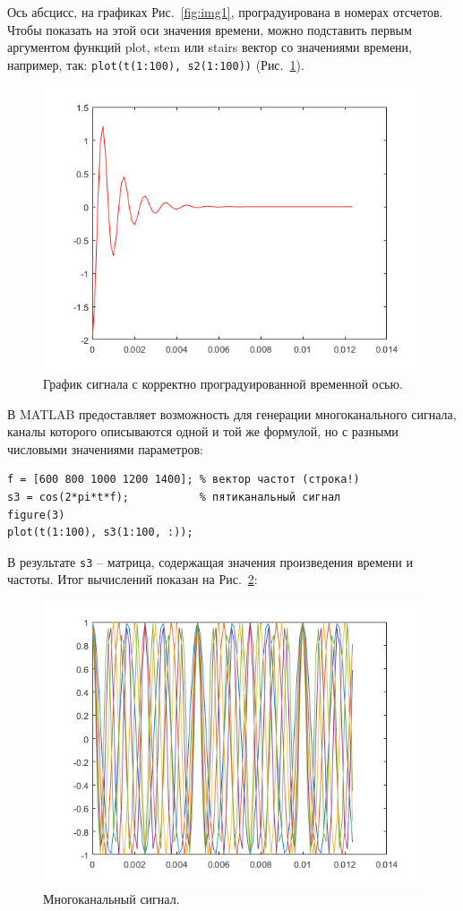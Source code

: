 \documentclass[12pt,a4paper]{article}
\begin{document}
Ось абсцисс, на графиках Рис.~\ref{fig:img1}, проградуирована в номерах отсчетов. Чтобы показать на этой оси значения времени, можно подставить первым аргументом функций plot, stem или stairs вектор со значениями времени, например, так: \verb|plot(t(1:100), s2(1:100))| (Рис.~\ref{fig:img2}).
\begin{figure}[!h]
  \centering
  \includegraphics[width=\linewidth]{img2}
  \caption{График сигнала с корректно проградуированной временной осью.}
  \label{fig:img2}
\end{figure}

В MATLAB предоставляет возможность для генерации многоканального сигнала, каналы которого описываются одной и той же формулой, но с разными числовыми значениями параметров:
\begin{verbatim}
f = [600 800 1000 1200 1400]; % вектор частот (строка!)
s3 = cos(2*pi*t*f);           % пятиканальный сигнал
figure(3)
plot(t(1:100), s3(1:100, :));
\end{verbatim}
В результате \verb|s3| -- матрица, содержащая значения произведения времени и частоты. Итог вычислений показан на Рис.~\ref{fig:img3}:
\begin{figure}[!ht]
  \centering
  \includegraphics[width=\linewidth]{img3}
  \caption{Многоканальный сигнал.}
  \label{fig:img3}
\end{figure}
\end{document}
